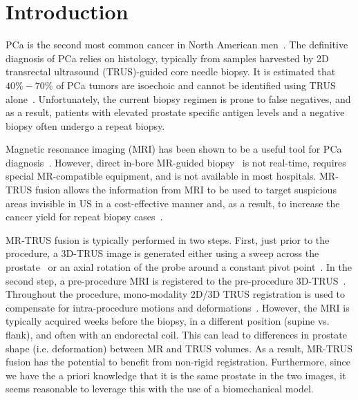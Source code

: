 \documentclass[runningheads,a4paper]{llncs}
\begin{document}
\section{Introduction}\label{sec:intro}
PCa is the second most common cancer in North American men~\cite{Cancer13a}. The definitive diagnosis of PCa relies on histology, typically from samples harvested by 2D transrectal ultrasound (TRUS)-guided core needle biopsy. It is estimated that $40\%-70\%$ of PCa tumors are isoechoic and cannot be identified using TRUS alone~\cite{Rifkin90}. Unfortunately, the current biopsy regimen is prone to false negatives, and as a result, patients with elevated prostate specific antigen levels and a negative biopsy often undergo a repeat biopsy.

Magnetic resonance imaging (MRI) has been shown to be a useful tool for PCa diagnosis~\cite{Zakian05a}. However, direct in-bore MR-guided biopsy~\cite{Xu11a} is not real-time, requires special MR-compatible equipment, and is not available in most hospitals. MR-TRUS fusion allows the information from MRI to be used to target suspicious areas invisible in US in a cost-effective manner and, as a result, to increase the cancer yield for repeat biopsy cases~\cite{Vourganti12a}.

MR-TRUS fusion is typically performed in two steps. First, just prior to the procedure, a 3D-TRUS image is generated either using a sweep across the prostate~\cite{Xu2007a} or an axial rotation of the probe around a constant pivot point~\cite{Cool11a,Sun13a}. In the second step, a pre-procedure MRI is registered to the pre-procedure 3D-TRUS~\cite{Cool11a,Sun13a,Xu2007a}. Throughout the procedure, mono-modality 2D/3D TRUS registration is used to compensate for intra-procedure motions and deformations~\cite{Silva13a}. However, the MRI is typically acquired weeks before the biopsy, in a different position (supine vs. flank), and often with an endorectal coil.  This can lead to differences in prostate shape (i.e. deformation) between MR and TRUS volumes. As a result, MR-TRUS fusion has the potential to benefit from non-rigid registration.  Furthermore, since we have the a priori knowledge that it is the same prostate in the two images, it seems reasonable to leverage this with the use of a biomechanical model.
\end{document}
